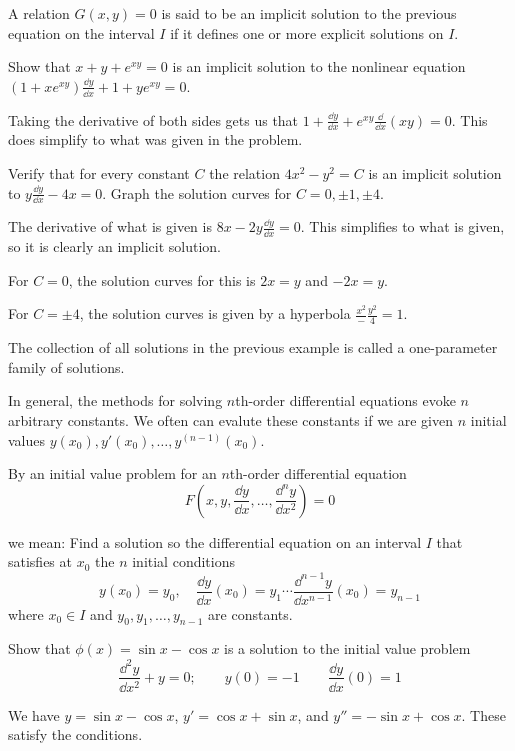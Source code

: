 \documentclass[../diffeq.tex]{subfiles}
\begin{document}
A relation $G(x,y) =0$ is said to be an implicit solution to the previous equation on the interval $I$ if it defines one or more explicit solutions on $I$.

\begin{example}
    Show that $x+y+e^{xy}=0$ is an implicit solution to the nonlinear equation $(1+xe^{xy})\frac{\dd y}{\dd x}+1+ye^{xy}=0$. 

    Taking the derivative of both sides gets us that $1+\frac{\dd y}{\dd x}+e^{xy}\frac{\dd}{\dd x}(xy) =0$. This does simplify to what was given in the problem.
\end{example}

\pagebreak
\begin{example}
    Verify that for every constant $C$ the relation $4x^2-y^2=C$ is an implicit solution to $y\frac{\dd y}{\dd x}-4x=0$. Graph the solution curves for $C=0,\pm 1,\pm 4$.

    The derivative of what is given is $8x-2y\frac{\dd y}{\dd x}=0$. This simplifies to what is given, so it is clearly an implicit solution. 

    For $C=0$, the solution curves for this is $2x=y$ and $-2x=y$.

    For $C=\pm 4$, the solution curves is given by a hyperbola $\frac{x^2}-\frac{y^2}{4}=1$. 
\end{example}

The collection of all solutions in the previous example is called a one-parameter family of solutions.

In general, the methods for solving $n$th-order differential equations evoke $n$ arbitrary constants. We often can evalute these constants 
if we are given $n$ initial values $y(x_0), y'(x_0),\dots, y^{(n-1)}(x_0)$.

\begin{definition}
    By an initial value problem for an $n$th-order differential equation 
    \[ F(x,y,\frac{\dd y}{\dd x},\dots,\frac{\dd^n y}{\dd x^2}) =0 \]

    we mean: Find a solution so the differential equation on an interval $I$ that satisfies at $x_0$ the $n$ initial conditions
    \[ y(x_0)=y_0, \quad \frac{\dd y}{\dd x}(x_0)=y_1 \cdots \frac{\dd^{n-1}y}{\dd x^{n-1}}(x_0)=y_{n-1}\]
    where $x_0\in I$ and $y_0, y_1, \dots, y_{n-1}$ are constants.
\end{definition}

\begin{example}
    Show that $\phi(x)=\sin x-\cos x$ is a solution to the initial value problem 
    \[ \frac{\dd^2 y}{\dd x^2}+y = 0; \qquad y(0)=-1 \qquad \frac{\dd y}{\dd x}(0)=1 \]

    We have $y=\sin x-\cos x$, $y'=\cos x+\sin x$, and $y'' = -\sin x+\cos x$. These satisfy the conditions.
\end{example}
\end{document}
